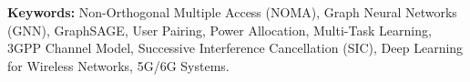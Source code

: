 \vspace{0.5cm}

\noindent\textbf{Keywords:} Non-Orthogonal Multiple Access (NOMA), Graph Neural Networks (GNN), GraphSAGE, User Pairing, Power Allocation, Multi-Task Learning, 3GPP Channel Model, Successive Interference Cancellation (SIC), Deep Learning for Wireless Networks, 5G/6G Systems.

\newpage
